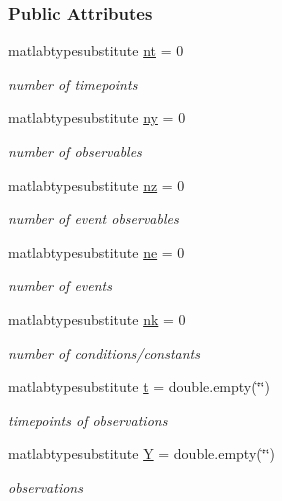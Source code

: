 \subsubsection*{Public Attributes}
\begin{DoxyCompactItemize}
\item 
matlabtypesubstitute \hyperlink{classamidata_a03cfcdd983bff4aef77268b785b28345}{nt} = 0
\begin{DoxyCompactList}\small\item\em number of timepoints \end{DoxyCompactList}\item 
matlabtypesubstitute \hyperlink{classamidata_a289ca425eb368f1d582b6be2be0d3dfc}{ny} = 0
\begin{DoxyCompactList}\small\item\em number of observables \end{DoxyCompactList}\item 
matlabtypesubstitute \hyperlink{classamidata_a79f11413e5bfe18a0e71e17574399ad5}{nz} = 0
\begin{DoxyCompactList}\small\item\em number of event observables \end{DoxyCompactList}\item 
matlabtypesubstitute \hyperlink{classamidata_aaca25d624cf863f786f67137c62aa11d}{ne} = 0
\begin{DoxyCompactList}\small\item\em number of events \end{DoxyCompactList}\item 
matlabtypesubstitute \hyperlink{classamidata_afd6bea572754e0c3c320664bdccf0200}{nk} = 0
\begin{DoxyCompactList}\small\item\em number of conditions/constants \end{DoxyCompactList}\item 
matlabtypesubstitute \hyperlink{classamidata_aaccc9105df5383111407fd5b41255e23}{t} = double.\+empty(\char`\"{}\char`\"{})
\begin{DoxyCompactList}\small\item\em timepoints of observations \end{DoxyCompactList}\item 
matlabtypesubstitute \hyperlink{classamidata_a0867f43e27585e019c13f7f4b7c4ab6b}{Y} = double.\+empty(\char`\"{}\char`\"{})
\begin{DoxyCompactList}\small\item\em observations \end{DoxyCompactList}\item 

\end{DoxyCompactItemize}
